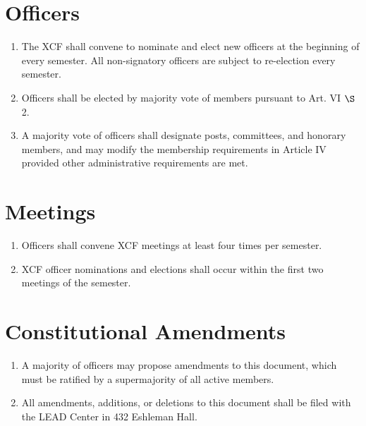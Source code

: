 \documentclass[english,a4paper]{article}
\begin{document}
\section{Officers}

\begin{enumerate}

\item The XCF shall convene to nominate and elect new officers at the beginning of every semester. All non-signatory officers
  are subject to re-election every semester.

\item Officers shall be elected by majority vote of members pursuant to Art. VI $\S$ 2.

\item A majority vote of officers shall designate posts, committees, and
  honorary members, and may modify the membership requirements in Article IV provided other administrative requirements are met.

\end{enumerate}

\section{Meetings}

\begin{enumerate}
\item
  Officers shall convene XCF meetings at least four times per semester.

\item
  XCF officer nominations and elections shall occur within the first
  two meetings of the semester.

\end{enumerate}
\section{Constitutional Amendments}

\begin{enumerate}
\item
  A majority of officers may propose amendments to this document, which must be ratified by a supermajority of all active members.

\item
  All amendments, additions, or deletions to this document shall be
  filed with the LEAD Center in 432 Eshleman Hall.
\end{enumerate}
\end{document}
